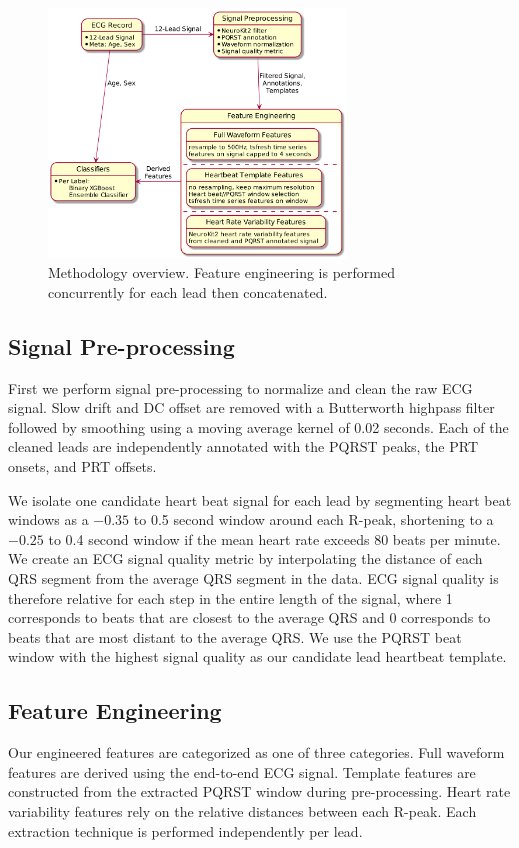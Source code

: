 \documentclass[twocolumn]{cinc}
\begin{document}
\begin{figure}[ht]
  \centering
  \includegraphics[width=7.9cm]{fig/methodology.png}
  \caption{Methodology overview. Feature engineering is performed concurrently for each lead then concatenated.}
  \label{fig:methodology}
\end{figure}

\subsection{Signal Pre-processing}

First we perform signal pre-processing to normalize and clean the raw ECG signal.
Slow drift and DC offset are removed with a Butterworth highpass filter followed by smoothing using a moving average kernel of 0.02 seconds.
Each of the cleaned leads are independently annotated with the PQRST peaks, the PRT onsets, and PRT offsets.

We isolate one candidate heart beat signal for each lead by segmenting heart beat windows as a $-0.35$ to 0.5 second window around each R-peak, shortening to a $-0.25$ to 0.4 second window if the mean heart rate exceeds 80 beats per minute.
We create an ECG signal quality metric by interpolating the distance of each QRS segment from the average QRS segment in the data.
ECG signal quality is therefore relative for each step in the entire length of the signal, where 1 corresponds to beats that are closest to the average QRS and 0 corresponds to beats that are most distant to the average QRS.
We use the PQRST beat window with the highest signal quality as our candidate lead heartbeat template.

\subsection{Feature Engineering}

Our engineered features are categorized as one of three categories.
Full waveform features are derived using the end-to-end ECG signal.
Template features are constructed from the extracted PQRST window during pre-processing.
Heart rate variability features rely on the relative distances between each R-peak.
Each extraction technique is performed independently per lead.
\end{document}
